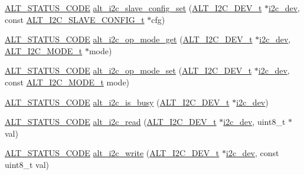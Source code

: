 \begin{DoxyCompactItemize}
\item 
\mbox{\hyperlink{hwlib_8h_abdb0d369f069723ca55d6c94bcaaaa12}{A\+L\+T\+\_\+\+S\+T\+A\+T\+U\+S\+\_\+\+C\+O\+DE}} \mbox{\hyperlink{group__ALT__I2C_gaf11d526a49799f04d8f5336bce0dde18}{alt\+\_\+i2c\+\_\+slave\+\_\+config\+\_\+set}} (\mbox{\hyperlink{structALT__I2C__DEV__s}{A\+L\+T\+\_\+\+I2\+C\+\_\+\+D\+E\+V\+\_\+t}} $\ast$\mbox{\hyperlink{structi2c__dev}{i2c\+\_\+dev}}, const \mbox{\hyperlink{group__ALT__I2C_ga9c0d22378cb1d6eb0194ca424026081d}{A\+L\+T\+\_\+\+I2\+C\+\_\+\+S\+L\+A\+V\+E\+\_\+\+C\+O\+N\+F\+I\+G\+\_\+t}} $\ast$cfg)
\item 
\mbox{\hyperlink{hwlib_8h_abdb0d369f069723ca55d6c94bcaaaa12}{A\+L\+T\+\_\+\+S\+T\+A\+T\+U\+S\+\_\+\+C\+O\+DE}} \mbox{\hyperlink{group__ALT__I2C_ga422d03c04681a4c27b1894ffe133213c}{alt\+\_\+i2c\+\_\+op\+\_\+mode\+\_\+get}} (\mbox{\hyperlink{structALT__I2C__DEV__s}{A\+L\+T\+\_\+\+I2\+C\+\_\+\+D\+E\+V\+\_\+t}} $\ast$\mbox{\hyperlink{structi2c__dev}{i2c\+\_\+dev}}, \mbox{\hyperlink{group__ALT__I2C_ga15e9cb79693e43e74075112b2aebe1e2}{A\+L\+T\+\_\+\+I2\+C\+\_\+\+M\+O\+D\+E\+\_\+t}} $\ast$mode)
\item 
\mbox{\hyperlink{hwlib_8h_abdb0d369f069723ca55d6c94bcaaaa12}{A\+L\+T\+\_\+\+S\+T\+A\+T\+U\+S\+\_\+\+C\+O\+DE}} \mbox{\hyperlink{group__ALT__I2C_gafc79f16589bc6e18cfa6841d316c8109}{alt\+\_\+i2c\+\_\+op\+\_\+mode\+\_\+set}} (\mbox{\hyperlink{structALT__I2C__DEV__s}{A\+L\+T\+\_\+\+I2\+C\+\_\+\+D\+E\+V\+\_\+t}} $\ast$\mbox{\hyperlink{structi2c__dev}{i2c\+\_\+dev}}, const \mbox{\hyperlink{group__ALT__I2C_ga15e9cb79693e43e74075112b2aebe1e2}{A\+L\+T\+\_\+\+I2\+C\+\_\+\+M\+O\+D\+E\+\_\+t}} mode)
\item 
\mbox{\hyperlink{hwlib_8h_abdb0d369f069723ca55d6c94bcaaaa12}{A\+L\+T\+\_\+\+S\+T\+A\+T\+U\+S\+\_\+\+C\+O\+DE}} \mbox{\hyperlink{group__ALT__I2C_ga511834bf99afd6c808d4fdc593a40bde}{alt\+\_\+i2c\+\_\+is\+\_\+busy}} (\mbox{\hyperlink{structALT__I2C__DEV__s}{A\+L\+T\+\_\+\+I2\+C\+\_\+\+D\+E\+V\+\_\+t}} $\ast$\mbox{\hyperlink{structi2c__dev}{i2c\+\_\+dev}})
\item 
\mbox{\hyperlink{hwlib_8h_abdb0d369f069723ca55d6c94bcaaaa12}{A\+L\+T\+\_\+\+S\+T\+A\+T\+U\+S\+\_\+\+C\+O\+DE}} \mbox{\hyperlink{group__ALT__I2C_ga4fef6676a5473f870bf441d29932239b}{alt\+\_\+i2c\+\_\+read}} (\mbox{\hyperlink{structALT__I2C__DEV__s}{A\+L\+T\+\_\+\+I2\+C\+\_\+\+D\+E\+V\+\_\+t}} $\ast$\mbox{\hyperlink{structi2c__dev}{i2c\+\_\+dev}}, uint8\+\_\+t $\ast$val)
\item 
\mbox{\hyperlink{hwlib_8h_abdb0d369f069723ca55d6c94bcaaaa12}{A\+L\+T\+\_\+\+S\+T\+A\+T\+U\+S\+\_\+\+C\+O\+DE}} \mbox{\hyperlink{group__ALT__I2C_ga22c701c3cecc56086156a0cde75277ef}{alt\+\_\+i2c\+\_\+write}} (\mbox{\hyperlink{structALT__I2C__DEV__s}{A\+L\+T\+\_\+\+I2\+C\+\_\+\+D\+E\+V\+\_\+t}} $\ast$\mbox{\hyperlink{structi2c__dev}{i2c\+\_\+dev}}, const uint8\+\_\+t val)

\end{DoxyCompactItemize}
